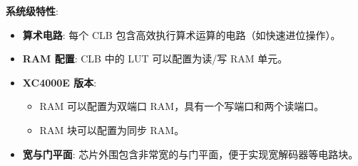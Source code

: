 \documentclass[
  ignorenonframetext,
  chinese,
]{beamer}
\providecommand{\tightlist}{%
  \setlength{\itemsep}{0pt}\setlength{\parskip}{0pt}}
\begin{document}
\begin{frame}
\begin{block}{\textbf{系统级特性}:}
\label{ux7cfbux7edfux7ea7ux7279ux6027}
\begin{itemize}
\tightlist
\item
  \textbf{算术电路}: 每个 CLB
  包含高效执行算术运算的电路（如快速进位操作）。
\item
  \textbf{RAM 配置}: CLB 中的 LUT 可以配置为读/写 RAM 单元。
\item
  \textbf{XC4000E 版本}:

  \begin{itemize}
  \tightlist
  \item
    RAM 可以配置为双端口 RAM，具有一个写端口和两个读端口。
  \item
    RAM 块可以配置为同步 RAM。
  \end{itemize}
\item
  \textbf{宽与门平面}:
  芯片外围包含非常宽的与门平面，便于实现宽解码器等电路块。
\end{itemize}
\end{block}
\end{frame}
\end{document}
